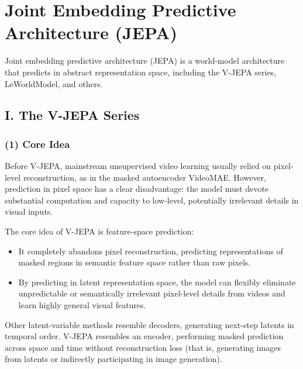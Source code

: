 \setcounter{section}{3}

\hypertarget{joint-embedding-predictive-architecture-jepa}{%
\section{Joint Embedding Predictive Architecture (JEPA)}\label{joint-embedding-predictive-architecture-jepa}}

Joint embedding predictive architecture (JEPA) is a world-model architecture that predicts in abstract representation space, including the V-JEPA series, LeWorldModel, and others.

\hypertarget{i.-the-v-jepa-series}{%
\subsection{I. The V-JEPA Series}\label{i.-the-v-jepa-series}}

\hypertarget{core-idea-6}{%
\subsubsection{(1) Core Idea}\label{core-idea-6}}

Before V-JEPA, mainstream unsupervised video learning usually relied on pixel-level reconstruction, as in the masked autoencoder VideoMAE. However, prediction in pixel space has a clear disadvantage: the model must devote substantial computation and capacity to low-level, potentially irrelevant details in visual inputs.

The core idea of V-JEPA is feature-space prediction:

\begin{itemize}
\tightlist
\item
  It completely abandons pixel reconstruction, predicting representations of masked regions in semantic feature space rather than raw pixels.
\item
  By predicting in latent representation space, the model can flexibly eliminate unpredictable or semantically irrelevant pixel-level details from videos and learn highly general visual features.
\end{itemize}

Other latent-variable methods resemble decoders, generating next-step latents in temporal order. V-JEPA resembles an encoder, performing masked prediction across space and time without reconstruction loss (that is, generating images from latents or indirectly participating in image generation).

